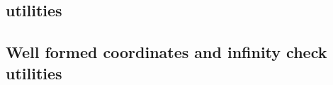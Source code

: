 \subsection{\wcpMod{} utilities}                                       \label{bls: wcp utilities}                                              
\subsection{Well formed coordinates and infinity check utilities}      \label{bls: well formed coordinates and infinity check utilities}       
